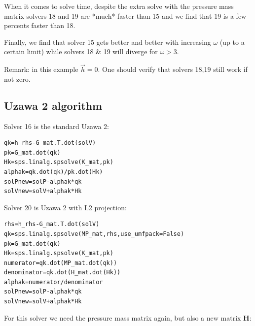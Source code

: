 When it comes to solve time, despite the extra solve with the 
pressure mass matrix solvers 18 and 19 are *much* faster than 15
and we find that 19 is a few percents faster than 18. 

Finally, we find that solver 15 gets better and better with increasing $\omega$
(up to a certain limit) while solvers 18 \& 19 will diverge for $\omega>3$.

Remark: in this example $\vec{h}=0$. One should verify that solvers 18,19 still work if not zero.

\subsection*{Uzawa 2 algorithm}

Solver 16 is the standard Uzawa 2:
\begin{lstlisting}
qk=h_rhs-G_mat.T.dot(solV)      
pk=G_mat.dot(qk)               
Hk=sps.linalg.spsolve(K_mat,pk) 
alphak=qk.dot(qk)/pk.dot(Hk)   
solPnew=solP-alphak*qk        
solVnew=solV+alphak*Hk       
\end{lstlisting}


Solver 20 is Uzawa 2 with L2 projection: 
\begin{lstlisting}
rhs=h_rhs-G_mat.T.dot(solV)
qk=sps.linalg.spsolve(MP_mat,rhs,use_umfpack=False)    
pk=G_mat.dot(qk)                           
Hk=sps.linalg.spsolve(K_mat,pk)             
numerator=qk.dot(MP_mat.dot(qk))             
denominator=qk.dot(H_mat.dot(Hk))             
alphak=numerator/denominator                   
solPnew=solP-alphak*qk                          
solVnew=solV+alphak*Hk                           
\end{lstlisting}

For this solver we need the pressure mass matrix again, but also a new
matrix ${\bm H}$:

